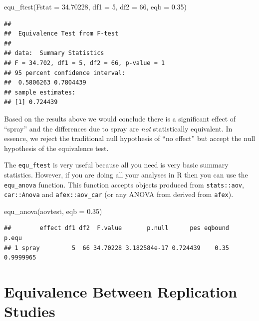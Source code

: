 \documentclass[]{interact}
\theoremstyle{plain}%
\theoremstyle{definition}
\theoremstyle{remark}
\newenvironment{Shaded}{\begin{snugshade}}{\end{snugshade}}
\newcommand{\AttributeTok}[1]{\textcolor[rgb]{0.77,0.63,0.00}{#1}}
\newcommand{\DecValTok}[1]{\textcolor[rgb]{0.00,0.00,0.81}{#1}}
\newcommand{\FloatTok}[1]{\textcolor[rgb]{0.00,0.00,0.81}{#1}}
\newcommand{\FunctionTok}[1]{\textcolor[rgb]{0.00,0.00,0.00}{#1}}
\newcommand{\NormalTok}[1]{#1}
\begin{document}
\begin{Shaded}
\begin{Highlighting}[]
\FunctionTok{equ\_ftest}\NormalTok{(}\AttributeTok{Fstat =} \FloatTok{34.70228}\NormalTok{,  }\AttributeTok{df1 =} \DecValTok{5}\NormalTok{, }\AttributeTok{df2 =} \DecValTok{66}\NormalTok{,  }\AttributeTok{eqb =} \FloatTok{0.35}\NormalTok{)}
\end{Highlighting}
\end{Shaded}

\begin{verbatim}
## 
##  Equivalence Test from F-test
## 
## data:  Summary Statistics
## F = 34.702, df1 = 5, df2 = 66, p-value = 1
## 95 percent confidence interval:
##  0.5806263 0.7804439
## sample estimates:
## [1] 0.724439
\end{verbatim}

Based on the results above we would conclude there is a significant
effect of ``spray'' and the differences due to spray are \emph{not}
statistically equivalent. In essence, we reject the traditional null
hypothesis of ``no effect'' but accept the null hypothesis of the
equivalence test.

\newpage

The \texttt{equ\_ftest} is very useful because all you need is very
basic summary statistics. However, if you are doing all your analyses in
R then you can use the \texttt{equ\_anova} function. This function
accepts objects produced from \texttt{stats::aov}, \texttt{car::Anova}
and \texttt{afex::aov\_car} (or any ANOVA from derived from
\texttt{afex}).

\begin{Shaded}
\begin{Highlighting}[]
\FunctionTok{equ\_anova}\NormalTok{(aovtest,}
          \AttributeTok{eqb =} \FloatTok{0.35}\NormalTok{)}
\end{Highlighting}
\end{Shaded}

\begin{verbatim}
##        effect df1 df2  F.value       p.null      pes eqbound     p.equ
## 1 spray         5  66 34.70228 3.182584e-17 0.724439    0.35 0.9999965
\end{verbatim}

\newpage

\hypertarget{equivalence-between-replication-studies}{%
\section{Equivalence Between Replication
Studies}\label{equivalence-between-replication-studies}}
\end{document}
